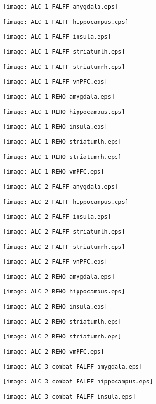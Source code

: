 \documentclass{article}
\begin{document}
\texttt{[image: ALC-1-FALFF-amygdala.eps]}

\newpage
\texttt{[image: ALC-1-FALFF-hippocampus.eps]}

\newpage
\texttt{[image: ALC-1-FALFF-insula.eps]}

\newpage
\texttt{[image: ALC-1-FALFF-striatumlh.eps]}

\newpage
\texttt{[image: ALC-1-FALFF-striatumrh.eps]}

\newpage
\texttt{[image: ALC-1-FALFF-vmPFC.eps]}

\newpage
\texttt{[image: ALC-1-REHO-amygdala.eps]}

\newpage
\texttt{[image: ALC-1-REHO-hippocampus.eps]}

\newpage
\texttt{[image: ALC-1-REHO-insula.eps]}

\newpage
\texttt{[image: ALC-1-REHO-striatumlh.eps]}

\newpage
\texttt{[image: ALC-1-REHO-striatumrh.eps]}

\newpage
\texttt{[image: ALC-1-REHO-vmPFC.eps]}

\newpage
\texttt{[image: ALC-2-FALFF-amygdala.eps]}

\newpage
\texttt{[image: ALC-2-FALFF-hippocampus.eps]}

\newpage
\texttt{[image: ALC-2-FALFF-insula.eps]}

\newpage
\texttt{[image: ALC-2-FALFF-striatumlh.eps]}

\newpage
\texttt{[image: ALC-2-FALFF-striatumrh.eps]}

\newpage
\texttt{[image: ALC-2-FALFF-vmPFC.eps]}

\newpage
\texttt{[image: ALC-2-REHO-amygdala.eps]}

\newpage
\texttt{[image: ALC-2-REHO-hippocampus.eps]}

\newpage
\texttt{[image: ALC-2-REHO-insula.eps]}

\newpage
\texttt{[image: ALC-2-REHO-striatumlh.eps]}

\newpage
\texttt{[image: ALC-2-REHO-striatumrh.eps]}

\newpage
\texttt{[image: ALC-2-REHO-vmPFC.eps]}

\newpage
\texttt{[image: ALC-3-combat-FALFF-amygdala.eps]}

\newpage
\texttt{[image: ALC-3-combat-FALFF-hippocampus.eps]}

\newpage
\texttt{[image: ALC-3-combat-FALFF-insula.eps]}
\end{document}
